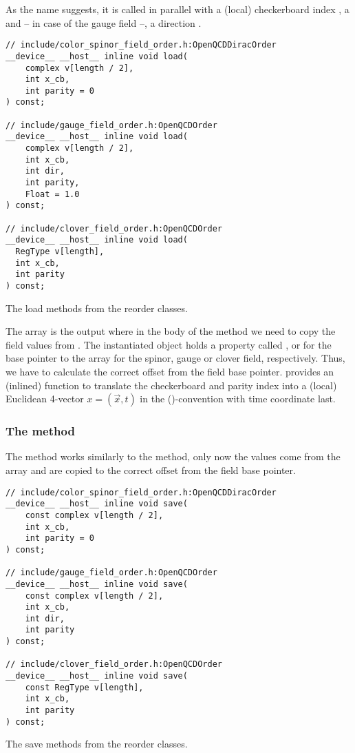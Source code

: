 As the name suggests, it is called in parallel with a (local) checkerboard index , a  and -- in case of the gauge field --, a direction .
\begin{codelisting}
\begin{verbatim}
// include/color_spinor_field_order.h:OpenQCDDiracOrder
__device__ __host__ inline void load(
    complex v[length / 2],
    int x_cb,
    int parity = 0
) const;

// include/gauge_field_order.h:OpenQCDOrder
__device__ __host__ inline void load(
    complex v[length / 2],
    int x_cb,
    int dir,
    int parity,
    Float = 1.0
) const;

// include/clover_field_order.h:OpenQCDOrder
__device__ __host__ inline void load(
  RegType v[length],
  int x_cb,
  int parity
) const;
\end{verbatim}
\caption{The load methods from the reorder classes.}
\label{lst:interface:load}
\end{codelisting}
The array  is the output where in the body of the method we need to copy the field values from \openqxd.
The instantiated object holds a property called ,  or  for the base pointer to the \openqxd array for the spinor, gauge or clover field, respectively.
Thus, we have to calculate the correct offset from the field base pointer.
\Quda provides an (inlined) function  to translate the checkerboard and parity index into a (local) Euclidean 4-vector $x = (\vec{x}, t)$ in the (\xyzt)-convention with time coordinate last.

\subsubsection{The  method}

The  method works similarly to the  method, only now the values come from the  array and are copied to the correct offset from the field base pointer.
\begin{codelisting}
\begin{verbatim}
// include/color_spinor_field_order.h:OpenQCDDiracOrder
__device__ __host__ inline void save(
    const complex v[length / 2],
    int x_cb,
    int parity = 0
) const;

// include/gauge_field_order.h:OpenQCDOrder
__device__ __host__ inline void save(
    const complex v[length / 2],
    int x_cb,
    int dir,
    int parity
) const;

// include/clover_field_order.h:OpenQCDOrder
__device__ __host__ inline void save(
    const RegType v[length],
    int x_cb,
    int parity
) const;
\end{verbatim}
\caption{The save methods from the reorder classes.}
\label{lst:interface:save}
\end{codelisting}

